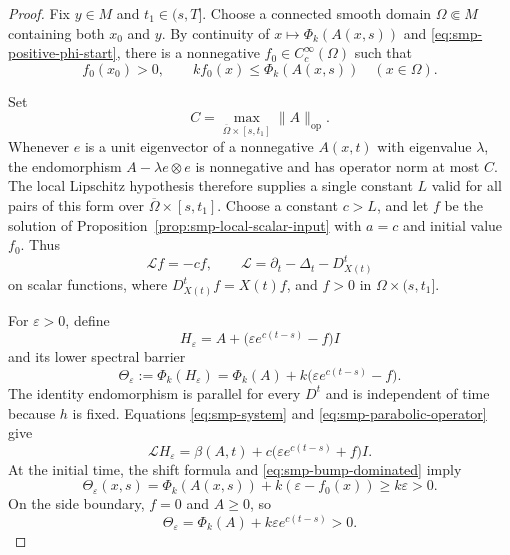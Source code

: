 \documentclass[10pt]{coll-l}
\theoremstyle{definition}
\theoremstyle{remark}
\numberwithin{section}{chapter}
\numberwithin{equation}{chapter}
\begin{document}
\begin{proof}
Fix $y\in M$ and $t_1\in(s,T]$.  Choose a connected smooth domain
$\Omega\Subset M$ containing both $x_0$ and $y$.  By continuity of
$x\mapsto\Phi_k(A(x,s))$ and
\eqref{eq:smp-positive-phi-start}, there is a nonnegative
$f_0\in C_c^\infty(\Omega)$ such that
\begin{equation}
 f_0(x_0)>0,
 \qquad
 kf_0(x)\leq\Phi_k(A(x,s))\quad(x\in\Omega).             \label{eq:smp-bump-dominated}
\end{equation}

Set
\[
              C=\max_{\overline\Omega\times[s,t_1]}
                    \|A\|_{\mathrm{op}}.
\]
Whenever $e$ is a unit eigenvector of a nonnegative $A(x,t)$ with
eigenvalue $\lambda$, the endomorphism
$A-\lambda e\otimes e$ is nonnegative and has operator norm at most $C$.
The local Lipschitz hypothesis therefore supplies a single constant $L$
valid for all pairs of this form over
$\overline\Omega\times[s,t_1]$.  Choose a constant $c>L$, and let $f$ be
the solution of Proposition~\ref{prop:smp-local-scalar-input} with
$a=c$ and initial value $f_0$.  Thus
\begin{equation}
 \mathcal L f=-cf,
 \qquad
 \mathcal L=\partial_t-\Delta_t-D^t_{X(t)}               \label{eq:smp-parabolic-operator}
\end{equation}
on scalar functions, where $D^t_{X(t)}f=X(t)f$, and
$f>0$ in $\Omega\times(s,t_1]$.

For $\varepsilon>0$, define
\begin{equation}
 H_\varepsilon
   =A+\bigl(\varepsilon e^{c(t-s)}-f\bigr)I              \label{eq:smp-barrier-tensor}
\end{equation}
and its lower spectral barrier
\begin{equation}
 \Theta_\varepsilon
   :=\Phi_k(H_\varepsilon)
    =\Phi_k(A)+k\bigl(\varepsilon e^{c(t-s)}-f\bigr).     \label{eq:smp-theta-barrier}
\end{equation}
The identity endomorphism is parallel for every $D^t$ and is independent
of time because $h$ is fixed.  Equations
\eqref{eq:smp-system} and \eqref{eq:smp-parabolic-operator} give
\begin{equation}
 \mathcal L H_\varepsilon
 =\beta(A,t)
   +c\bigl(\varepsilon e^{c(t-s)}+f\bigr)I.              \label{eq:smp-barrier-evolution}
\end{equation}
At the initial time, the shift formula and
\eqref{eq:smp-bump-dominated} imply
\[
 \Theta_\varepsilon(x,s)
 =\Phi_k(A(x,s))+k(\varepsilon-f_0(x))
 \geq k\varepsilon>0.
\]
On the side boundary, $f=0$ and $A\geq0$, so
\[
 \Theta_\varepsilon
 =\Phi_k(A)+k\varepsilon e^{c(t-s)}>0.
\]


\end{proof}
\end{document}

